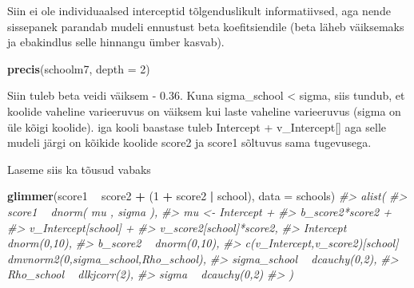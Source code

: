 \documentclass[]{book}
\newenvironment{Shaded}{\begin{snugshade}}{\end{snugshade}}
\newcommand{\CommentTok}[1]{\textcolor[rgb]{0.56,0.35,0.01}{\textit{#1}}}
\newcommand{\DataTypeTok}[1]{\textcolor[rgb]{0.13,0.29,0.53}{#1}}
\newcommand{\DecValTok}[1]{\textcolor[rgb]{0.00,0.00,0.81}{#1}}
\newcommand{\KeywordTok}[1]{\textcolor[rgb]{0.13,0.29,0.53}{\textbf{#1}}}
\newcommand{\NormalTok}[1]{#1}
\newcommand{\OperatorTok}[1]{\textcolor[rgb]{0.81,0.36,0.00}{\textbf{#1}}}
\newcommand{\StringTok}[1]{\textcolor[rgb]{0.31,0.60,0.02}{#1}}
\begin{document}
Siin ei ole individuaalsed interceptid tõlgenduslikult informatiivsed, aga nende sissepanek parandab mudeli ennustust beta koefitsiendile (beta läheb väiksemaks ja ebakindlus selle hinnangu ümber kasvab).

\begin{Shaded}
\begin{Highlighting}[]
\KeywordTok{precis}\NormalTok{(schoolm7, }\DataTypeTok{depth =} \DecValTok{2}\NormalTok{)}
\end{Highlighting}
\end{Shaded}

Siin tuleb beta veidi väiksem - 0.36. Kuna sigma\_school \textless{} sigma, siis tundub, et koolide vaheline varieeruvus on väiksem kui laste vaheline varieeruvus (sigma on üle kõigi koolide). iga kooli baastase tuleb Intercept + v\_Intercept{[}{]} aga selle mudeli järgi on kõikide koolide score2 ja score1 sõltuvus sama tugevusega.

Laseme siis ka tõusud vabaks

\begin{Shaded}
\begin{Highlighting}[]
\KeywordTok{glimmer}\NormalTok{(score1 }\OperatorTok{~}\StringTok{ }\NormalTok{score2 }\OperatorTok{+}\StringTok{ }\NormalTok{(}\DecValTok{1} \OperatorTok{+}\StringTok{  }\NormalTok{score2 }\OperatorTok{|}\StringTok{ }\NormalTok{school), }\DataTypeTok{data =}\NormalTok{ schools)}
\CommentTok{#> alist(}
\CommentTok{#>     score1 ~ dnorm( mu , sigma ),}
\CommentTok{#>     mu <- Intercept +}
\CommentTok{#>         b_score2*score2 +}
\CommentTok{#>         v_Intercept[school] +}
\CommentTok{#>         v_score2[school]*score2,}
\CommentTok{#>     Intercept ~ dnorm(0,10),}
\CommentTok{#>     b_score2 ~ dnorm(0,10),}
\CommentTok{#>     c(v_Intercept,v_score2)[school] ~ dmvnorm2(0,sigma_school,Rho_school),}
\CommentTok{#>     sigma_school ~ dcauchy(0,2),}
\CommentTok{#>     Rho_school ~ dlkjcorr(2),}
\CommentTok{#>     sigma ~ dcauchy(0,2)}
\CommentTok{#> )}
\end{Highlighting}
\end{Shaded}
\end{document}
